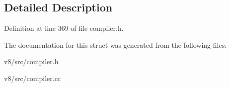 \subsection{Detailed Description}


Definition at line 369 of file compiler.\+h.



The documentation for this struct was generated from the following files\+:\begin{DoxyCompactItemize}
\item 
v8/src/compiler.\+h\item 
v8/src/compiler.\+cc\end{DoxyCompactItemize}
